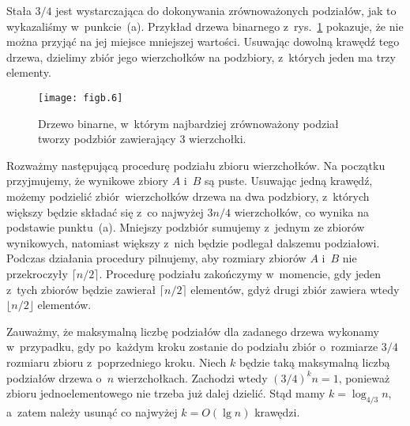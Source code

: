 \subproblem %
Stała $3/4$ jest wystarczająca do dokonywania zrównoważonych podziałów, jak to wykazaliśmy w~punkcie~(a). Przykład drzewa binarnego z~rys.~\ref{fig:B-3b} pokazuje, że nie można przyjąć na jej miejsce mniejszej wartości. Usuwając dowolną krawędź tego drzewa, dzielimy zbiór jego wierzchołków na podzbiory, z~których jeden ma trzy elementy.
\begin{figure}[ht]
	\begin{center}
		\texttt{[image: figb.6]}
	\end{center}
	\caption{Drzewo binarne, w~którym najbardziej zrównoważony podział tworzy podzbiór zawierający 3 wierzchołki.} \label{fig:B-3b}
\end{figure}

\subproblem %
Rozważmy następującą procedurę podziału zbioru wierzchołków. Na początku przyjmujemy, że wynikowe zbiory $A$ i~$B$ są puste. Usuwając jedną krawędź, możemy podzielić  zbiór~wierzchołków drzewa na dwa podzbiory, z~których większy będzie składać się z~co najwyżej $3n/4$ wierzchołków, co wynika na podstawie punktu~(a). Mniejszy podzbiór sumujemy z~jednym ze zbiorów wynikowych, natomiast większy z~nich będzie podlegał dalszemu podziałowi. Podczas działania procedury pilnujemy, aby rozmiary zbiorów $A$ i~$B$ nie przekroczyły $\lceil n/2\rceil$. Procedurę podziału zakończymy w~momencie, gdy jeden z~tych zbiorów będzie zawierał $\lceil n/2\rceil$ elementów, gdyż drugi zbiór zawiera wtedy $\lfloor n/2\rfloor$ elementów.

Zauważmy, że maksymalną liczbę podziałów dla zadanego drzewa wykonamy w~przypadku, gdy po~każdym kroku zostanie do podziału zbiór o~rozmiarze $3/4$ rozmiaru zbioru z~poprzedniego kroku. Niech $k$ będzie taką maksymalną liczbą podziałów drzewa o~$n$ wierzchołkach. Zachodzi wtedy $(3/4)^kn=1$, ponieważ zbioru jednoelementowego nie trzeba już dalej dzielić. Stąd mamy $k=\log_{4/3}n$, a~zatem należy usunąć co najwyżej $k=O(\lg n)$ krawędzi.

\endinput
